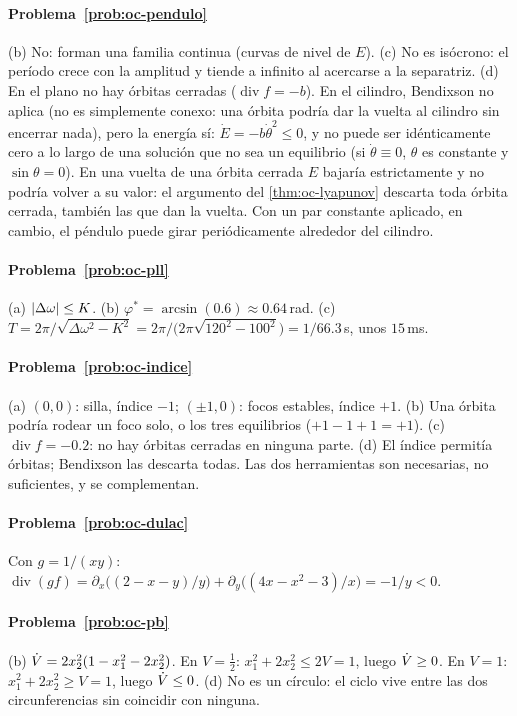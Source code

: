 \paragraph{Problema~\ref{prob:oc-pendulo}}
(b) No: forman una familia continua (curvas de nivel de $E$). (c) No es isócrono: el período crece con la amplitud y tiende a infinito al acercarse a la separatriz. (d) En el plano no hay órbitas cerradas ($\operatorname{div}f=-b$). En el cilindro, Bendixson no aplica (no es simplemente conexo: una órbita podría dar la vuelta al cilindro sin encerrar nada), pero la energía sí: $\dot E=-b\dot\theta^2\le0$, y no puede ser idénticamente cero a lo largo de una solución que no sea un equilibrio (si $\dot\theta\equiv0$, $\theta$ es constante y $\sin\theta=0$). En una vuelta de una órbita cerrada $E$ bajaría estrictamente y no podría volver a su valor: el argumento del \cref{thm:oc-lyapunov} descarta toda órbita cerrada, también las que dan la vuelta. Con un par constante aplicado, en cambio, el péndulo puede girar periódicamente alrededor del cilindro.

\paragraph{Problema~\ref{prob:oc-pll}}
(a) $\left\lvert \Delta\omega\right\rvert\le K$. (b) $\varphi^*=\arcsin(0.6)\approx0.64$\,rad. (c) $T=2\pi/\sqrt{\Delta\omega^2-K^2}=2\pi/\bigl(2\pi\sqrt{120^2-100^2}\bigr)=1/66.3$\,s, unos $15$\,ms.

\paragraph{Problema~\ref{prob:oc-indice}}
(a) $(0,0)$: silla, índice $-1$; $(\pm1,0)$: focos estables, índice $+1$. (b) Una órbita podría rodear un foco solo, o los tres equilibrios ($+1-1+1=+1$). (c) $\operatorname{div}f=-0.2$: no hay órbitas cerradas en ninguna parte. (d) El índice permitía órbitas; Bendixson las descarta todas. Las dos herramientas son necesarias, no suficientes, y se complementan.

\paragraph{Problema~\ref{prob:oc-dulac}}
Con $g=1/(xy)$: $\operatorname{div}(gf)=\partial_x\bigl((2-x-y)/y\bigr)+\partial_y\bigl((4x-x^2-3)/x\bigr)=-1/y<0$.

\paragraph{Problema~\ref{prob:oc-pb}}
(b) $\dot V=2x_2^2(1-x_1^2-2x_2^2)$. En $V=\tfrac12$: $x_1^2+2x_2^2\le2V=1$, luego $\dot V\ge0$. En $V=1$: $x_1^2+2x_2^2\ge V=1$, luego $\dot V\le0$. (d) No es un círculo: el ciclo vive entre las dos circunferencias sin coincidir con ninguna.

